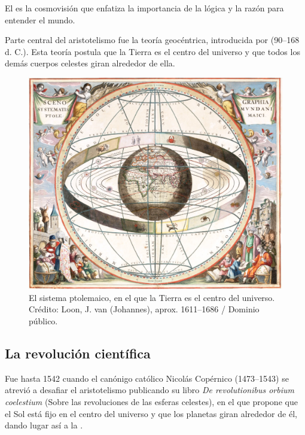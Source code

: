 \begin{remember}
    \label{rem:aristotelismo}
    El  es la cosmovisión que enfatiza
    la importancia de la lógica y la razón para entender el mundo.
\end{remember}

Parte central del aristotelismo fue la %
{teoría geocéntrica}, introducida por  (90--168
d. C.). Esta teoría postula que la Tierra es el centro del universo y que todos
los demás cuerpos celestes giran alrededor de ella.

\begin{figure}[ht]
    \centering
    \includegraphics[width=0.8\linewidth]{img/Cellarius_ptolemaic_system}
    \caption{El sistema ptolemaico, en el que la Tierra es el centro del
        universo. Crédito: Loon, J. van (Johannes), aprox. 1611--1686 /
        Dominio público.}
    \label{fig:ptolemaico}
\end{figure}

\subsection*{La revolución científica}
\label{sub:larevolucioncientifica}
Fue hasta 1542 cuando el canónigo católico %
{Nicolás Copérnico} (1473--1543) se atrevió a desafiar el aristotelismo
publicando su libro \emph{De revolutionibus orbium coelestium} (Sobre las
revoluciones de las esferas celestes), en el que propone que el Sol está fijo en
el centro del universo y que los planetas giran alrededor de él, dando lugar así
a la .


